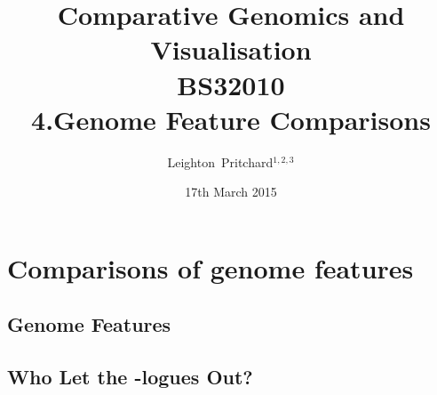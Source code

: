 

%



\title[Comparative Genomics and Visualisation: 4.Genome Features] %
{Comparative Genomics and \\ Visualisation \\
BS32010 \\
4.Genome Feature Comparisons}
\author[Pritchard] %
{Leighton~Pritchard$^{1,2,3}$}
\date[17th March 2015] %
{17th March 2015}
\subject{Bioinformatics, Genomics, Bacteria, Sequencing, Microbiology, Microbes, Comparative Genomics, Visualisation}





\frame[plain]{\titlepage}



\section{Comparisons of genome features}
\subsection{Genome Features}



\subsection{Who Let the -logues Out?}

